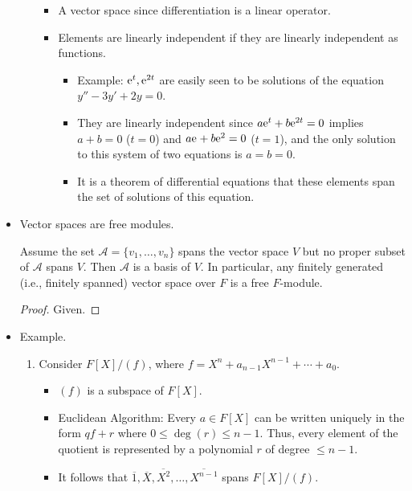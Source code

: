 \documentclass[../notes.tex]{subfiles}
\begin{document}
\begin{itemize}
\begin{enumerate}
\begin{itemize}
            \item A vector space since differentiation is a linear operator.
            \item Elements are linearly independent if they are linearly independent as functions.
            \begin{itemize}
                \item Example: $\e[t],\e[2t]$ are easily seen to be solutions of the equation $y''-3y'+2y=0$.
                \item They are linearly independent since $a\e[t]+b\e[2t]=0$ implies $a+b=0$ ($t=0$) and $a\e+b\e[2]=0$ ($t=1$), and the only solution to this system of two equations is $a=b=0$.
                \item It is a theorem of differential equations that these elements span the set of solutions of this equation.
            \end{itemize}
        \end{itemize}
    \end{enumerate}
    \item Vector spaces are free modules.
    \begin{proposition}\label{prp:11.1}
        Assume the set $\mathcal{A}=\{v_1,\dots,v_n\}$ spans the vector space $V$ but no proper subset of $\mathcal{A}$ spans $V$. Then $\mathcal{A}$ is a basis of $V$. In particular, any finitely generated (i.e., finitely spanned) vector space over $F$ is a free $F$-module.
        \begin{proof}
            Given.
        \end{proof}
    \end{proposition}
    \item Example.
    \begin{enumerate}
        \item Consider $F[X]/(f)$, where $f=X^n+a_{n-1}X^{n-1}+\cdots+a_0$.
        \begin{itemize}
            \item $(f)$ is a subspace of $F[X]$.
            \item Euclidean Algorithm: Every $a\in F[X]$ can be written uniquely in the form $qf+r$ where $0\leq\deg(r)\leq n-1$. Thus, every element of the quotient is represented by a polynomial $r$ of degree $\leq n-1$.
            \item It follows that $\overline{1},\overline{X},\overline{X^2},\dots,\overline{X^{n-1}}$ spans $F[X]/(f)$.
        \end{itemize}
    \end{enumerate}

\end{itemize}
\end{document}

